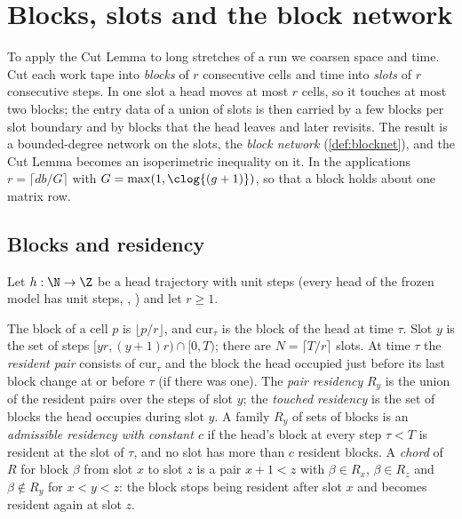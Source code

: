 \section{Blocks, slots and the block network}\label{sec:blocks}

To apply the Cut Lemma to long stretches of a run we coarsen space and time. Cut each work tape
into \emph{blocks} of $r$ consecutive cells and time into \emph{slots} of $r$ consecutive steps.
In one slot a head moves at most $r$ cells, so it touches at most two blocks; the entry data of a
union of slots is then carried by a few blocks per slot boundary and by blocks that the head
leaves and later revisits. The result is a bounded-degree network on the slots, the
\emph{block network} (\cref{def:blocknet}), and the Cut Lemma becomes an isoperimetric inequality on it. In the
applications $r=\lceil db/G\rceil$ with $G=\max(1,\clog{(g+1)})$, so that a block holds about one
matrix row.

\subsection{Blocks and residency}

Let $h:\N\to\Z$ be a head trajectory with unit steps (every head of the frozen model has unit
steps, , ) and let $r\ge1$.

\begin{definition}\label{def:residency}
The block of a cell $p$ is $\lfloor p/r\rfloor$, and $\mathrm{cur}_\tau$ is the block of the head
at time $\tau$. Slot $y$ is the set of steps $[yr,(y+1)r)\cap[0,T)$; there are
$N=\lceil T/r\rceil$ slots. At time $\tau$ the \emph{resident pair} consists of $\mathrm{cur}_\tau$
and the block the head occupied just before its last block change at or before $\tau$ (if there
was one). The \emph{pair residency} $R_y$ is the union of the resident pairs over the steps of
slot $y$; the \emph{touched residency} is the set of blocks the head occupies during slot $y$. A
family $R_y$ of sets of blocks is an \emph{admissible residency with constant $c$} if the head's
block at every step $\tau<T$ is resident at the slot of $\tau$, and no slot has more than $c$
resident blocks. A \emph{chord} of $R$ for block $\beta$ from slot $x$ to slot $z$ is a pair
$x+1<z$ with $\beta\in R_x$, $\beta\in R_z$ and $\beta\notin R_y$ for $x<y<z$: the block stops
being resident after slot $x$ and becomes resident again at slot $z$.
\end{definition}

